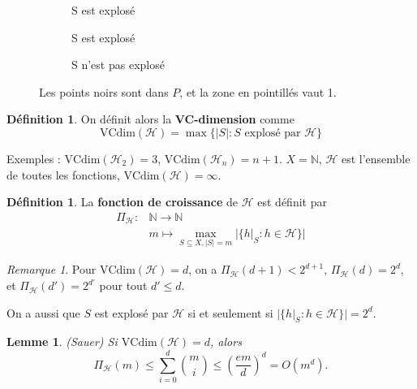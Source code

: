 \documentclass{article}
\theoremstyle{plain}
\newtheorem{lem}[thrm]{Lemme}
\theoremstyle{remark}
\newtheorem{rem}[thrm]{Remarque}
\theoremstyle{definition}
\newtheorem{defin}[thrm]{Définition}
\begin{document}
\begin{figure}
\begin{subfigure}{.3\textwidth}
\caption{S est explosé}
\end{subfigure}
\begin{subfigure}{.3\textwidth}
\centering
{}
\caption{S est explosé}
\end{subfigure}
\begin{subfigure}{.3\textwidth}
\centering
{}
\caption{S n'est pas explosé}
\end{subfigure}
\caption{Les points noirs sont dans $P$, et la zone en pointillés vaut 1.}
\end{figure}

\begin{defin}
    On définit alors la \textbf{VC-dimension} comme $$\text{VCdim}(\mathcal{H}) = \max \{ |S| : S \text{ explosé par } \mathcal{H} \}$$
\end{defin}

Exemples : $\text{VCdim}(\mathcal{H}_2) = 3$, $\text{VCdim}(\mathcal{H}_n) = n+1$. $X=\mathbb{N}$, $\mathcal{H}$ est l'ensemble de toutes les fonctions, $\text{VCdim}(\mathcal{H}) = \infty $.

\begin{defin}
    La \textbf{fonction de croissance} de $\mathcal{H}$ est définit par
    \begin{align*}
        \Pi_\mathcal{H} : & \mathbb{N} \rightarrow \mathbb{N}\\
        & m \mapsto \max_{S\subseteq X, |S|=m} |\{h|_S : h\in \mathcal{H}\} |
    \end{align*}
\end{defin}

\begin{rem}
    Pour $\text{VCdim}(\mathcal{H}) = d$, on a $\Pi_\mathcal{H}(d+1)<2^{d+1}$, $\Pi_\mathcal{H}(d)=2^d$, et $\Pi_\mathcal{H}(d')=2^{d'}$ pour tout $d'\leq d$.
    
    On a aussi que $S$ est explosé par $\mathcal{H}$ si et seulement si $|\{h|_S : h\in \mathcal{H}\} |=2^d$.
\end{rem}

\begin{lem}(Sauer)
    Si $\text{VCdim}(\mathcal{H}) = d$, alors $$\Pi_\mathcal{H}(m) \leq \sum\limits_{i=0}^d {m\choose i} \leq \left ( \frac{e m}{d} \right )^d = O(m^d) .$$
\end{lem}
\end{document}
